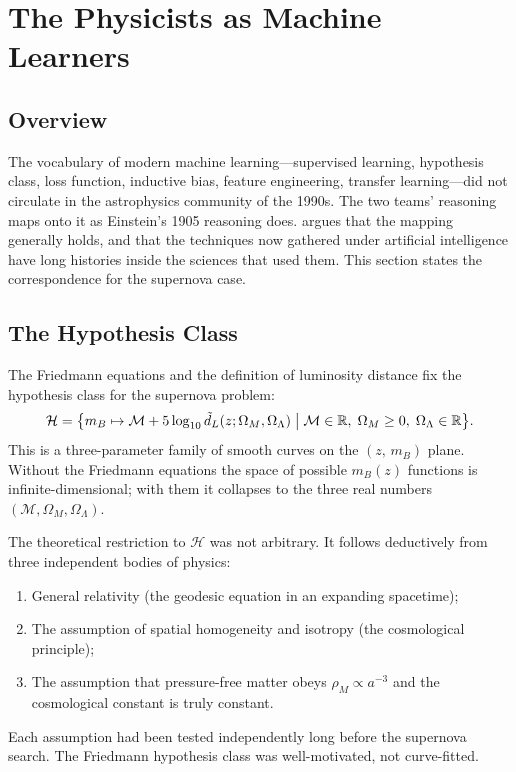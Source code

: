\documentclass[12pt]{article}
\begin{document}
\section{The Physicists as Machine Learners}
\label{sec:ml}

\subsection{Overview}

The vocabulary of modern machine learning---supervised learning, hypothesis
class, loss function, inductive bias, feature engineering, transfer
learning---did not circulate in the astrophysics community of the 1990s.
The two teams' reasoning maps onto it as Einstein's 1905 reasoning does.
\citet{sargent2025sources} argues that the mapping generally holds, and that
the techniques now gathered under artificial intelligence have long histories
inside the sciences that used them.  This section states the correspondence
for the supernova case.

\subsection{The Hypothesis Class}

The Friedmann equations and the definition of luminosity distance fix the
hypothesis class for the supernova problem:
\begin{equation}\label{eq:hyp_class}
  \mathcal{H} = \bigl\{
    m_B \mapsto \mathcal{M} + 5\log_{10}\tilde d_L(z;\Omega_M,\Omega_\Lambda)
    \bigm|
    \mathcal{M}\in\mathbb{R},\;
    \Omega_M \geq 0,\;
    \Omega_\Lambda \in\mathbb{R}
  \bigr\}.
\end{equation}
This is a three-parameter family of smooth curves on the $(z,\,m_B)$ plane.
Without the Friedmann equations the space of possible $m_B(z)$ functions is
infinite-dimensional; with them it collapses to the three real numbers
$({\mathcal M}, \Omega_M, \Omega_\Lambda)$.

The theoretical restriction to $\mathcal{H}$ was not arbitrary.  It follows
deductively from three independent bodies of physics:
\begin{enumerate}
  \item General relativity (the geodesic equation in an expanding spacetime);
  \item The assumption of spatial homogeneity and isotropy (the cosmological
    principle);
  \item The assumption that pressure-free matter obeys $\rho_M \propto a^{-3}$
    and the cosmological constant is truly constant.
\end{enumerate}
Each assumption had been tested independently long before the supernova search.
The Friedmann hypothesis class was well-motivated, not curve-fitted.
\end{document}
